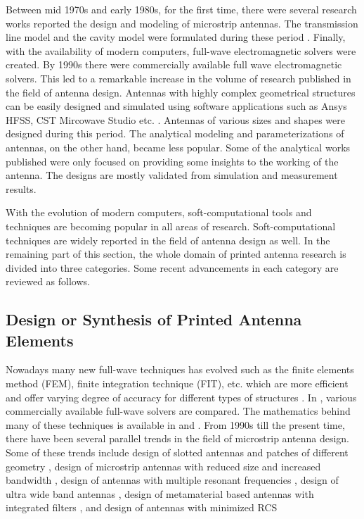 Between mid 1970s and early 1980s, for the first time, there were several research works reported the design and modeling of microstrip antennas. The transmission line model and the cavity model were formulated during these period \cite{handbook}. Finally, with the availability of modern computers, full-wave electromagnetic solvers were created. By 1990s there were commercially available full wave electromagnetic solvers. This led to a remarkable increase in the volume of research published in the field of antenna design. Antennas with highly complex geometrical structures can be easily designed and simulated using software applications such as Ansys HFSS{\circledR}, CST Mircowave Studio{\circledR} etc. \cite{practGuide3D}. Antennas of various sizes and shapes were designed during this period. The analytical modeling and parameterizations of antennas, on the other hand, became less popular. Some of the analytical works published were only focused on providing some insights to the working of the antenna. The designs are mostly validated from simulation and measurement results.

With the evolution of modern computers, soft-computational tools and techniques are becoming popular in all areas of research. Soft-computational techniques are widely reported in the field of antenna design as well. In the remaining part of this section, the whole domain of printed antenna research is divided into three categories. Some recent advancements in each category are reviewed as follows.

\subsection{Design or Synthesis of Printed Antenna Elements}
Nowadays many new full-wave techniques has evolved such as the finite elements method (FEM), finite integration technique (FIT), etc. which are more efficient and offer varying degree of accuracy for different types of structures \cite{practGuide3D}. In \cite{practGuide3D}, various commercially available full-wave solvers are compared. The mathematics behind many of these techniques is available in \cite{handbook} and \cite{numericalbook}. From 1990s till the present time, there have been several parallel trends in the field of microstrip antenna design. Some of these trends include design of slotted antennas and patches of different geometry \cite{HPatch1, uslot1}, design of microstrip antennas with reduced size and increased bandwidth \cite{smallPatch0, BandSize0}, design of antennas with multiple resonant frequencies \cite{dualBandPatch1, dualBandCircPol,fractal1}, design of ultra wide band antennas \cite{slottedUWB, PMA01}, design of metamaterial based antennas with integrated filters \cite{bandnotchCSRR1, bandnotchEBG1}, and design of antennas with minimized RCS \cite{rcs1992, rcs2014, rcs2016}

